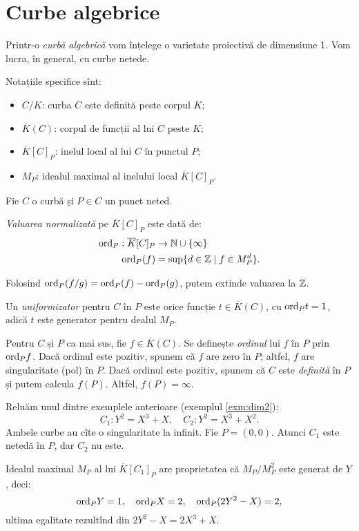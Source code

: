 \chapter{Curbe algebrice}

Printr-o \emph{curbă algebrică} vom înțelege o varietate proiectivă de
dimensiune 1. Vom lucra, în general, cu curbe netede.

Notațiile specifice sînt:
\begin{itemize}
    \item $ C/K $: curba $ C $ este definită peste corpul $ K $;
    \item $ \overline{K}(C) $: corpul de funcții al lui $ C $ peste $ K $;
    \item $ \overline{K}[C]_P $: inelul local al lui $ C $ în punctul $ P $;
    \item $ M_P $: idealul maximal al inelului local $ \overline{K}[C]_P $.
\end{itemize}

\begin{definition}\label{def:valuare-norm}
    Fie $ C $ o curbă și $ P \in C $ un punct neted.

    \emph{Valuarea normalizată} pe $ \overline{K}[C]_P $ este dată de:
    \begin{align*}
        \mathrm{ord}_P : \overline{K}[C]_P &\to \mathbb{N} \cup \{ \infty \} \\
        \mathrm{ord}_P(f) &= \sup \{ d \in \mathbb{Z} \mid f \in M_P^d \}.
    \end{align*}

    Folosind $ \mathrm{ord}_P(f/g) = \mathrm{ord}_P(f) - \mathrm{ord}_P(g) $, putem
    extinde valuarea la $ \mathbb{Z} $.

    Un \emph{uniformizator} pentru $ C $ în $ P $ este orice funcție
    $ t \in \overline{K}(C) $, cu $ \mathrm{ord}_P t = 1 $, adică
    $ t $ este generator pentru dealul $ M_P $.
\end{definition}

Pentru $ C $ și $ P $ ca mai sus, fie $ f \in \overline{K}(C) $.
Se definește \emph{ordinul} lui $ f $ în $ P $ prin $ \mathrm{ord}_P f $.
Dacă ordinul este pozitiv, spunem că $ f $ are zero în $ P $; altfel,
$ f $ are singularitate (pol) în $ P $. Dacă ordinul este pozitiv,
spunem că $ C $ este \emph{definită} în $ P $ și putem calcula $ f(P) $.
Altfel, $ f(P) = \infty $.

\begin{example}\label{exm:ordin}
    Reluăm unul dintre exemplele anterioare (exemplul \ref{exm:dim2}):
    \[
        C_1: Y^2 = X^3 + X, \quad C_2: Y^2 = X^3 + X^2.
    \]
    Ambele curbe au cîte o singularitate la infinit. Fie $ P = (0, 0) $.
    Atunci $ C_1 $ este netedă în $ P $, dar $ C_2 $ nu este.

    Idealul maximal $ M_P $ al lui $ \overline{K}[C_1]_P $ are proprietatea că
    $ M_P/M_P^2 $ este generat de $ Y $, deci:
    \[
        \mathrm{ord}_P Y = 1, \quad \mathrm{ord}_P X = 2, \quad \mathrm{ord}_P(2Y^2 - X) = 2,
    \]
    ultima egalitate rezultînd din $ 2Y^2 - X = 2X^3 + X $.
\end{example}

